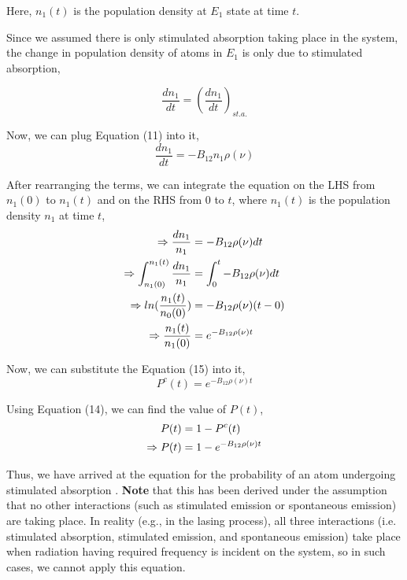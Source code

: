 \documentclass[12pt]{article}
\begin{document}
Here, $n_{1}(t)$ is the population density at $E_{1}$ state at time $t$. \vspace{.2cm}

Since we assumed there is only stimulated absorption taking place in the system, the change in population density of atoms in $E_{1}$ is only due to stimulated absorption,

\begin{equation*}
    \frac{dn_{1}}{dt} = (\frac{dn_{1}}{dt})_{st.a.}
\end{equation*} \vspace{.1cm}

Now, we can plug Equation (11) into it,
\begin{equation*}
    \frac{dn_{1}}{dt} = -B_{12}n_{1}\rho(\nu) 
\end{equation*}

After rearranging the terms, we can integrate the equation on the LHS from $n_{1}(0)$ to $n_{1}(t)$ and on the RHS from $0$ to $t$, where $n_{1}(t)$ is the population density $n_{1}$ at time $t$,
\begin{align}
    \Rightarrow \frac{dn_{1}}{n_{1}} & = -B_{12}\rho(\nu)dt \notag \\
    \Rightarrow \int_{n_{1}(0)}^{n_{1}(t)} \frac{dn_{1}}{n_{1}} & = \int_{0}^{t} -B_{12}\rho(\nu)dt \notag \\
    \Rightarrow ln(\frac{n_{1}(t)}{n_{0}(0)}) & = -B_{12}\rho(\nu)(t - 0) \notag \\
    \Rightarrow \frac{n_{1}(t)}{n_{1}(0)} & = e^{-B_{12}\rho(\nu)t}
\end{align}

Now, we can substitute the Equation (15) into it,
\begin{equation*}
    P^c(t) = e^{-B_{12}\rho(\nu)t}
\end{equation*}

Using Equation (14), we can find the value of $P(t)$,
\begin{align}
    P(t) & = 1 - P^c(t) \notag \\
    \Rightarrow P(t) & = 1 - e^{-B_{12}\rho(\nu)t}
\end{align}

Thus, we have arrived at the equation for the probability of an atom undergoing stimulated absorption . \textbf{Note} that this has been derived under the assumption that no other interactions (such as stimulated emission or spontaneous emission) are taking place. In reality (e.g., in the lasing process), all three interactions (i.e. stimulated absorption, stimulated emission, and spontaneous emission) take place when radiation having required frequency is incident on the system, so in such cases, we cannot apply this equation. \vspace{.2cm}
\end{document}
